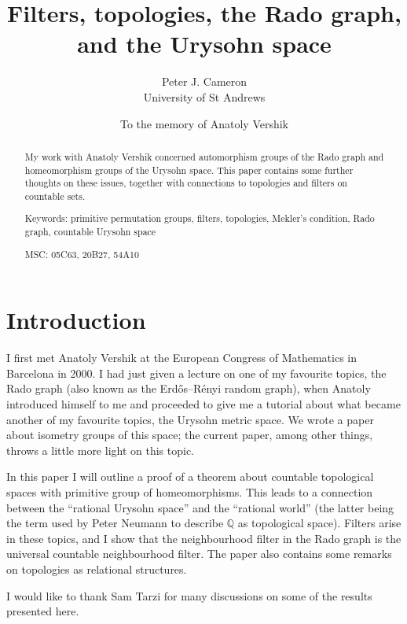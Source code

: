 \documentclass[12pt]{article}
\begin{document}
\title{Filters, topologies, the Rado graph, and the Urysohn space}
\author{Peter J. Cameron\\\small{University of St Andrews}}
\date{To the memory of Anatoly Vershik}
\maketitle

\begin{abstract}
My work with Anatoly Vershik concerned automorphism groups of the Rado graph
and homeomorphism groups of the Urysohn space. This paper contains some further
thoughts on these issues, together with connections to topologies and filters
on countable sets.

\medskip

Keywords: primitive permutation groups, filters, topologies, Mekler's
condition, Rado graph, countable Urysohn space

MSC: 05C63, 20B27, 54A10

\end{abstract}

\section{Introduction}

I first met Anatoly Vershik at the European Congress of Mathematics in
Barcelona in 2000. I had just given a lecture on one of my favourite topics,
the Rado graph (also known as the Erd\H{o}s--R\'enyi random graph), when
Anatoly introduced himself to me and proceeded to give me a tutorial about
what became another of my favourite topics, the Urysohn metric space. We
wrote a paper~\cite{cv} about isometry groups of this space; the current
paper, among other things, throws a little more light on this topic.

In this paper I will outline a proof of a theorem about countable
topological spaces with primitive group of homeomorphisms. This leads to
a connection between the ``rational Urysohn space'' and the
``rational world'' (the latter being the term used by Peter Neumann to
describe $\mathbb{Q}$ as topological space). Filters arise in these topics,
and I show that the neighbourhood filter in the Rado graph is the universal
countable neighbourhood filter.
The paper also contains some remarks on topologies as relational structures.

I would like to thank Sam Tarzi for many discussions on some of the results
presented here.
\end{document}
